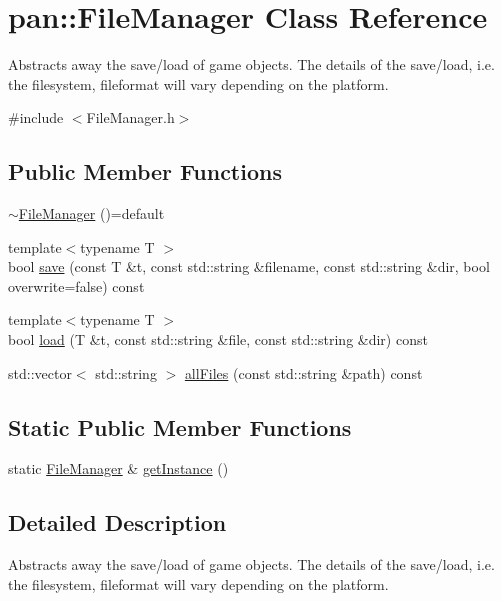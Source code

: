 \hypertarget{classpan_1_1_file_manager}{}\section{pan\+:\+:File\+Manager Class Reference}
\label{classpan_1_1_file_manager}


Abstracts away the save/load of game objects. The details of the save/load, i.\+e. the filesystem, fileformat will vary depending on the platform.  




{\ttfamily \#include $<$File\+Manager.\+h$>$}

\subsection*{Public Member Functions}
\begin{DoxyCompactItemize}
\item 
\hyperlink{classpan_1_1_file_manager_a4637c4b4f9d1c264d5373eafe9f8ef60}{$\sim$\+File\+Manager} ()=default
\item 
{\footnotesize template$<$typename T $>$ }\\bool \hyperlink{classpan_1_1_file_manager_ab897366e9055e7e251a67d82b1cefcaa}{save} (const T \&t, const std\+::string \&filename, const std\+::string \&dir, bool overwrite=false) const
\item 
{\footnotesize template$<$typename T $>$ }\\bool \hyperlink{classpan_1_1_file_manager_ac0112a350779701a11110042bd053458}{load} (T \&t, const std\+::string \&file, const std\+::string \&dir) const
\item 
std\+::vector$<$ std\+::string $>$ \hyperlink{classpan_1_1_file_manager_af9d8a64e6bd6cae23ee56af2f13a8124}{all\+Files} (const std\+::string \&path) const
\end{DoxyCompactItemize}
\subsection*{Static Public Member Functions}
\begin{DoxyCompactItemize}
\item 
static \hyperlink{classpan_1_1_file_manager}{File\+Manager} \& \hyperlink{classpan_1_1_file_manager_a9c6dc615236819bad04dc9db880db6f6}{get\+Instance} ()
\end{DoxyCompactItemize}


\subsection{Detailed Description}
Abstracts away the save/load of game objects. The details of the save/load, i.\+e. the filesystem, fileformat will vary depending on the platform. 

